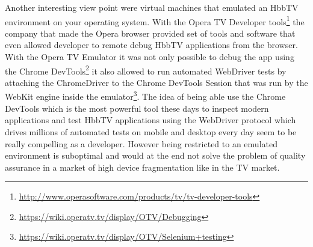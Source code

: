 Another interesting view point were virtual machines that emulated an HbbTV environment on your operating system.
With the Opera TV Developer tools\footnote{\url{http://www.operasoftware.com/products/tv/tv-developer-tools}} the
company that made the Opera browser provided set of tools and software that even allowed developer to remote debug
HbbTV applications from the browser. With the Opera TV Emulator it was not only possible to debug the app using
the Chrome DevTools\footnote{\url{https://wiki.operatv.tv/display/OTV/Debugging}} it also allowed to run automated
WebDriver tests by attaching the ChromeDriver to the Chrome DevTools Session that was run by the WebKit engine inside
the emulator\footnote{\url{https://wiki.operatv.tv/display/OTV/Selenium+testing}}. The idea of being able use the
Chrome DevTools which is the most powerful tool these days to inspect modern applications and test HbbTV applications
using the WebDriver protocol which drives millions of automated tests on mobile and desktop every day seem to be
really compelling as a developer. However being restricted to an emulated environment is suboptimal and would at the
end not solve the problem of quality assurance in a market of high device fragmentation like in the TV market.

